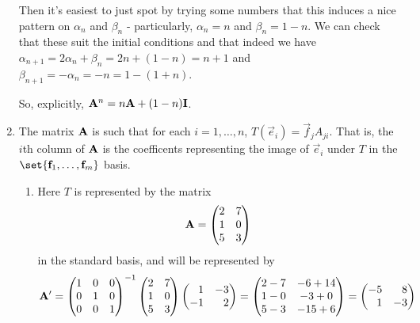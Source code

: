 \documentclass[fleqn,a4paper,11pt]{article}
\begin{document}
\begin{enumerate}[label=\textbf{\arabic*.}]
  Then it's easiest to just spot by trying some numbers that this induces a nice
  pattern on \(\alpha_n\) and \(\beta_n\) - particularly,
  \(\alpha_n = n\) and \(\beta_n = 1 - n\). We can check that these suit the
  initial conditions and that indeed we have
  \(\alpha_{n + 1} = 2\alpha_n + \beta_n = 2n + (1 - n) = n + 1\) and
  \(\beta_{n + 1} = -\alpha_n = -n = 1 - (1 + n)\).

  So, explicitly, \(\mathbf{A}^n = n\mathbf{A} + (1 - n)\mathbf{I}\).
 \item
  The matrix \(\mathbf{A}\) is such that for each \(i = 1, \dotsc, n\),
  \(T(\vec e_i) = \vec f_j A_{ji}\). That is, the \(i\)th column of \(\mathbf{A}\)
  is the coefficents representing the image of \(\vec e_i\) under \(T\) in the
  \(\set{\vec f_1, \dotsc, \vec f_m}\) basis.
  \begin{enumerate}[label=(\alph*)]
   \item
    Here \(T\) is represented by the matrix
    \begin{equation*}
     \mathbf{A} =
     \begin{pmatrix}
      2 & 7 \\
      1 & 0 \\
      5 & 3
     \end{pmatrix}
    \end{equation*}
    in the standard basis, and will be represented by
    \begin{equation*}
     \mat A' =
     \begin{pmatrix}
      1 & 0 & 0 \\
      0 & 1 & 0 \\
      0 & 0 & 1
     \end{pmatrix}^{-1}
     \begin{pmatrix}
      2 & 7 \\
      1 & 0 \\
      5 & 3
     \end{pmatrix}
     \begin{pmatrix*}[r]
      1 & -3 \\
      -1 & 2
     \end{pmatrix*}
     =
     \begin{pmatrix}
      2 - 7 & -6 + 14 \\
      1 - 0 & -3 + 0 \\
      5 - 3 & -15 + 6
     \end{pmatrix}
     =
     \begin{pmatrix*}[r]
      -5 & 8 \\
      1 & -3 \\

\end{pmatrix*}
\end{equation*}
\end{enumerate}
\end{enumerate}
\end{document}
